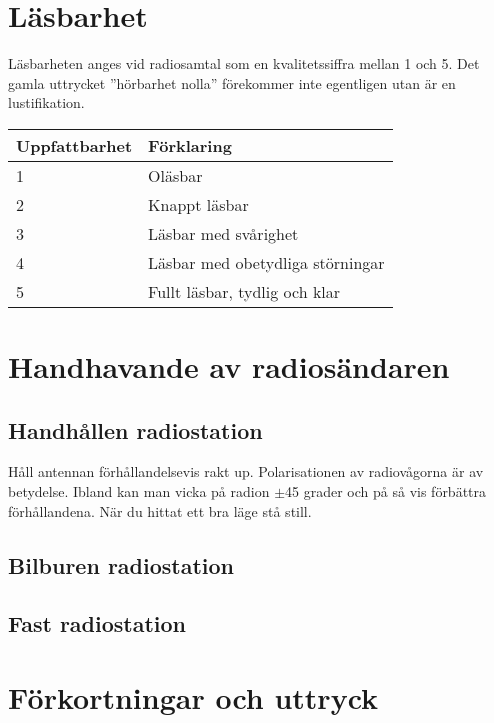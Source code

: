 \section{Läsbarhet}

Läsbarheten anges vid radiosamtal som en kvalitetssiffra mellan 1 och 5. Det gamla uttrycket ''hörbarhet nolla'' förekommer inte egentligen utan är en lustifikation.

\begin{tabular}{ll}
	Uppfattbarhet & Förklaring                       \\ \hline
	1             & Oläsbar                          \\
	2             & Knappt läsbar                    \\
	3             & Läsbar med svårighet             \\
	4             & Läsbar med obetydliga störningar \\
	5             & Fullt läsbar, tydlig och klar
\end{tabular}

\section{Handhavande av radiosändaren}

\subsection{Handhållen radiostation}

Håll antennan förhållandelsevis rakt up. Polarisationen av radiovågorna är av betydelse. Ibland kan man vicka på radion $\pm$45 grader och på så vis förbättra förhållandena. När du hittat ett bra läge stå still. 

\subsection{Bilburen radiostation}


\subsection{Fast radiostation}


\section{Förkortningar och uttryck}

